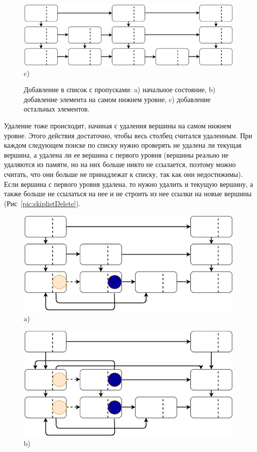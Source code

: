 \documentclass[12pt]{report}
\begin{document}
{\begin{figure}[h!]
\begin{minipage}[h]{0.60\linewidth}
				\centering \includegraphics[width=1\linewidth]{14} c)\\
			\end{minipage}
			\caption{Добавление в список с пропусками: a) начальное состояние, b) добавление элемента на самом нижнем уровне, c) добавление остальных элементов.}
			\label{pic:skiplist}
		\end{figure}
		\par Удаление тоже происходит, начиная с удаления вершины на самом нижнем уровне. Этого действия достаточно, чтобы весь столбец считался удаленным. При каждом следующем поиске по списку нужно проверять не удалена ли текущая вершина, а удалена ли ее вершина с первого уровня (вершины реально не удаляются из памяти, но на них больше никто не ссылается, поэтому можно считать, что они больше не принадлежат к списку, так как они недостижимы). Если вершина с первого уровня удалена, то нужно удалить и текущую вершину, а также больше не ссылаться на нее и не строить из нее ссылки на новые вершины (Рис~\ref{pic:skiplistDelete}).
		\begin{figure}[h!]
			\begin{minipage}[h]{0.45\linewidth}
				\center \includegraphics[width=1\linewidth]{15} a) \\
			\end{minipage}
			\hfill
			\begin{minipage}[h]{0.45\linewidth}
				\center \includegraphics[width=1\linewidth]{16} b) \\

\end{minipage}
\end{figure}}
\end{document}
